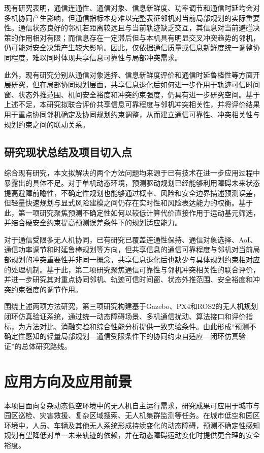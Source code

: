 现有研究表明，通信连通性、通信对象、信息新鲜度、功率调节和通信时延均会对多机协同产生影响，但通信指标本身难以完整表征邻机对当前局部规划的实际重要性。通信状态良好的邻机若距离较远且与当前轨迹缺乏交互，其信息对当前避碰决策的作用相对有限；而信息存在一定滞后但与本机具有明显交叉冲突趋势的邻机，仍可能对安全决策产生较大影响。因此，仅依据通信质量或信息新鲜度统一调整协同程度，难以同时体现共享信息可靠性与局部冲突需求。

此外，现有研究分别从通信对象选择、信息新鲜度评价和通信时延鲁棒性等方面开展研究，但在局部协同规划层面，共享信息退化后如何进一步作用于轨迹可信时间窗、状态外推范围、机间安全裕度和冲突约束强度，仍具有进一步研究空间。基于上述不足，本研究拟联合评价共享信息可靠程度与邻机冲突相关性，并将评价结果用于重点协同邻机确定及协同规划约束调整，从而建立通信可靠性、冲突相关性与规划约束之间的联动关系。

\subsection{研究现状总结及项目切入点}

综合现有研究，本文拟解决的两个方法问题均来源于已有技术在进一步应用过程中暴露出的具体不足。对于单机动态环境，预测驱动规划已经能够利用障碍未来状态提高避障前瞻性，不确定性规划也能够通过概率、风险和安全边界描述预测误差，但轻量快速规划与显式风险建模之间仍存在实时性和风险表达能力的权衡。基于此，第一项研究聚焦预测不确定性如何以较低计算代价直接作用于运动基元筛选，并结合硬安全约束提高预测误差条件下的规划适应能力。

对于通信受限多无人机协同，已有研究已覆盖连通性保持、通信对象选择、AoI、通信功率调节和时延鲁棒规划等方向，但共享信息的通信可靠程度与邻机对当前局部规划的冲突重要性并非同一概念，共享信息退化后也缺少与具体规划约束相对应的处理机制。基于此，第二项研究聚焦通信可靠性与邻机冲突相关性的联合评价，并进一步研究其对重点协同邻机、轨迹可信时间窗、状态外推范围、安全裕度和冲突约束强度的调节作用。

围绕上述两项方法研究，第三项研究构建基于Gazebo、PX4和ROS2的无人机规划闭环仿真验证系统，通过统一动态障碍场景、多机通信扰动、算法接口和评价指标，为方法对比、消融实验和综合性能分析提供一致实验条件。由此形成“预测不确定性感知的轻量局部规划—通信受限条件下的协同约束自适应—闭环仿真验证”的总体研究路线。

\section{应用方向及应用前景}

本项目面向复杂动态低空环境中的无人机自主运行需求，研究成果可应用于城市与园区巡检、灾害救援、复杂区域搜索、无人机集群监测等任务。在城市低空和园区环境中，人员、车辆及其他无人系统形成持续变化的动态障碍，预测不确定性感知规划有望降低对单一未来轨迹的依赖，并在动态障碍运动变化时提供更合理的安全裕度。

